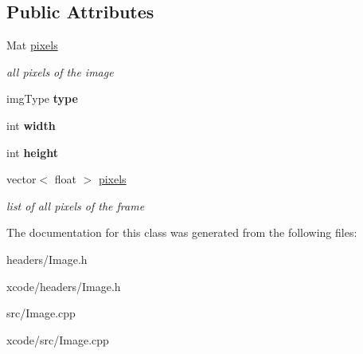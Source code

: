 \subsection*{Public Attributes}
\begin{DoxyCompactItemize}
\item 
\hypertarget{class_image_afd3bc2d21015dfbefba405e41de33e9b}{Mat \hyperlink{class_image_afd3bc2d21015dfbefba405e41de33e9b}{pixels}}\label{class_image_afd3bc2d21015dfbefba405e41de33e9b}

\begin{DoxyCompactList}\small\item\em all pixels of the image \end{DoxyCompactList}\item 
\hypertarget{class_image_a6c5f90a678bda512fc0f4b2945f04036}{img\-Type {\bfseries type}}\label{class_image_a6c5f90a678bda512fc0f4b2945f04036}

\item 
\hypertarget{class_image_ab8d12f635013c04159cd4d3d972bac88}{int {\bfseries width}}\label{class_image_ab8d12f635013c04159cd4d3d972bac88}

\item 
\hypertarget{class_image_a51df43db420c9c0b57536cb2dd36de5c}{int {\bfseries height}}\label{class_image_a51df43db420c9c0b57536cb2dd36de5c}

\item 
\hypertarget{class_image_ac22dddb0c4b1136c745f0dce6db7a1dc}{vector$<$ float $>$ \hyperlink{class_image_ac22dddb0c4b1136c745f0dce6db7a1dc}{pixels}}\label{class_image_ac22dddb0c4b1136c745f0dce6db7a1dc}

\begin{DoxyCompactList}\small\item\em list of all pixels of the frame \end{DoxyCompactList}\end{DoxyCompactItemize}


The documentation for this class was generated from the following files\-:\begin{DoxyCompactItemize}
\item 
headers/Image.\-h\item 
xcode/headers/Image.\-h\item 
src/Image.\-cpp\item 
xcode/src/Image.\-cpp\end{DoxyCompactItemize}
